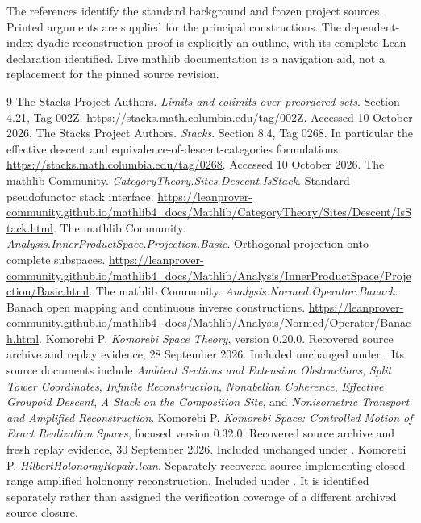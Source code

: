 \clearpage
{}\label{app:references}
The references identify the standard background and frozen project sources. Printed arguments are supplied for the principal constructions. The dependent-index dyadic reconstruction proof is explicitly an outline, with its complete Lean declaration identified. Live mathlib documentation is a navigation aid, not a replacement for the pinned source revision.

\begin{thebibliography}{9}
 The Stacks Project Authors. \emph{Limits and colimits over preordered sets}. Section 4.21, Tag 002Z. \url{https://stacks.math.columbia.edu/tag/002Z}. Accessed 10 October 2026.
 The Stacks Project Authors. \emph{Stacks}. Section 8.4, Tag 0268. In particular the effective descent and equivalence-of-descent-categories formulations. \url{https://stacks.math.columbia.edu/tag/0268}. Accessed 10 October 2026.
 The mathlib Community. \emph{CategoryTheory.Sites.Descent.IsStack}. Standard pseudofunctor stack interface. \url{https://leanprover-community.github.io/mathlib4_docs/Mathlib/CategoryTheory/Sites/Descent/IsStack.html}.
 The mathlib Community. \emph{Analysis.InnerProductSpace.Projection.Basic}. Orthogonal projection onto complete subspaces. \url{https://leanprover-community.github.io/mathlib4_docs/Mathlib/Analysis/InnerProductSpace/Projection/Basic.html}.
 The mathlib Community. \emph{Analysis.Normed.Operator.Banach}. Banach open mapping and continuous inverse constructions. \url{https://leanprover-community.github.io/mathlib4_docs/Mathlib/Analysis/Normed/Operator/Banach.html}.
 Komorebi P. \emph{Komorebi Space Theory}, version 0.20.0. Recovered source archive and replay evidence, 28 September 2026. Included unchanged under . Its source documents include \emph{Ambient Sections and Extension Obstructions}, \emph{Split Tower Coordinates}, \emph{Infinite Reconstruction}, \emph{Nonabelian Coherence}, \emph{Effective Groupoid Descent}, \emph{A Stack on the Composition Site}, and \emph{Nonisometric Transport and Amplified Reconstruction}.
 Komorebi P. \emph{Komorebi Space: Controlled Motion of Exact Realization Spaces}, focused version 0.32.0. Recovered source archive and fresh replay evidence, 30 September 2026. Included unchanged under .
 Komorebi P. \emph{HilbertHolonomyRepair.lean}. Separately recovered source implementing closed-range amplified holonomy reconstruction. Included under . It is identified separately rather than assigned the verification coverage of a different archived source closure.
\end{thebibliography}

